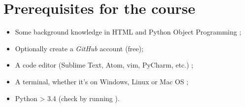 \section{Prerequisites for the course}
    \begin{itemize}
        \item Some background knowledge in HTML and Python Object Programming ;
        \item Optionally create a \emph{GitHub} account (free);
        \item A code editor (Sublime Text, Atom, vim, PyCharm, etc.) ;
        \item A terminal, whether it's on Windows, Linux or Mac OS ;
        \item Python > 3.4 (check by running ).
    \end{itemize}
